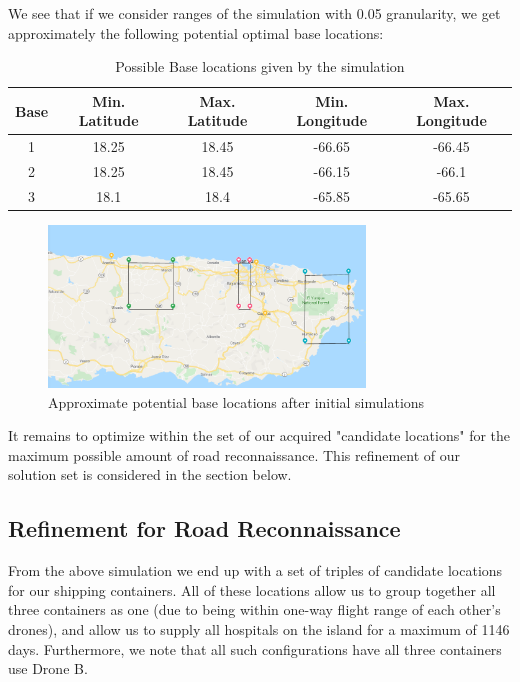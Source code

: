 We see that if we consider ranges of the simulation with 0.05 granularity, we get approximately the following potential optimal base locations: 
\begin{table}[h]
    \centering
    \begin{tabular}{c|c|c|c|c}
        \hline
        Base &  Min. Latitude & Max. Latitude & Min. Longitude & Max. Longitude \\
        \hline 1 & 18.25 & 18.45 & -66.65 & -66.45 \\
        2 & 18.25 & 18.45 & -66.15 & -66.1 \\
        3 & 18.1 & 18.4 & -65.85 & -65.65 \\
    \end{tabular}
    \caption{Possible Base locations given by the simulation}
    \label{tab:candidate_ranges}
\end{table}

\begin{figure}[h]
    \centering
    \includegraphics[width=0.75\textwidth]{2_3.png}
    \caption{Approximate potential base locations after initial simulations}
    \label{fig:2_3_map}
\end{figure}

It remains to optimize within the set of our acquired "candidate locations" for the maximum possible amount of road reconnaissance. This refinement of our solution set is considered in the section below.

\subsection{Refinement for Road Reconnaissance}

From the above simulation we end up with a set of triples of candidate locations for our shipping containers. All of these locations allow us to group together all three containers as one (due to being within one-way flight range of each other's drones), and allow us to supply all hospitals on the island for a maximum of 1146 days. Furthermore, we note that all such configurations have all three containers use Drone B.   

